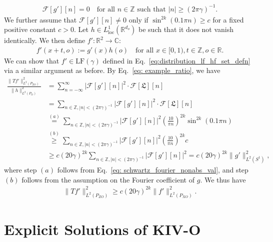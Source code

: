 \documentclass[11pt]{article}
\newcommand{\calF}{\mathcal{F}}
\newcommand{\0}{\mathbf{0}}
\begin{document}
\begin{appendix}
\begin{align*}
    \mathcal{F}[g'][n] = 0 \quad \text{for all } n \in \mathbb{Z} \text{ such that } |n| \geq (2\pi\gamma)^{-1}.
\end{align*}
We further assume that $\calF[g'][n]\neq 0$ only if $\sin^{2k}(0.1\pi n) \geq c$ for a fixed positive constant $c>0$. Let $h\in L^1_{\mathrm{loc}}(\mathbb{R}^{d_o})$ be such that it does not vanish identically. We then define $f': \mathbb{R}^2 \to \mathbb{C}$:
\begin{align*}
    f'(x+t,o):= g'(x)h(o)\quad \text{for all }x\in [0,1), t\in \mathbb{Z}, o\in \mathbb{R}.
\end{align*}
We can show that $f'\in \mathrm{LF}(\gamma)$ defined in Eq.~\eqref{eq:distribution_lf_hf_set_defn} via a similar argument as before. By Eq.~\eqref{eq: example_ratio}, we have
\begin{align*}
    \frac{\|Tf'\|^2_{L^2(P_{ZO})}}{\|h\|^2_{L^2(P_O)}} &= \sum_{n = -\infty}^{\infty}|\calF[g'][n]|^2\cdot \calF[\mathfrak{L}][n]\\
    &= \sum_{n\in \mathbb{Z}, |n| < (2\pi\gamma)^{-1}}|\calF[g'][n]|^2\cdot \calF[\mathfrak{L}][n]\\
    &\stackrel{(a)}{=} \sum_{n\in \mathbb{Z}, |n| < (2\pi\gamma)^{-1}}|\calF[g'][n]|^2 \left(\frac{10}{\pi n}\right)^{2k}\sin^{2k}(0.1\pi n)\\
    &\stackrel{(b)}{\geq} \sum_{n\in \mathbb{Z}, |n| < (2\pi\gamma)^{-1}}|\calF[g'][n]|^2 \left(\frac{10}{\pi n}\right)^{2k}c\\
    &\geq c(20\gamma)^{2k}\sum_{n\in \mathbb{Z}, |n| < (2\pi\gamma)^{-1}}|\calF[g'][n]|^2 = c(20\gamma)^{2k}\|g'\|^2_{L^2(S^1)},
\end{align*}
where step $(a)$ follows from Eq.~\eqref{eq: schwartz_fourier_nonabs_val}, and step $(b)$ follows from the assumption on the Fourier coefficient of $g$. We thus have
\begin{align*}
    \|Tf'\|^2_{L^2(P_{ZO})} \geq c(20\gamma)^{2k}\|f'\|^2_{L^2(P_{XO})}.
\end{align*}
\section{Explicit Solutions of KIV-O}
\label{sec:closed_form_kivo}


\end{appendix}
\end{document}
